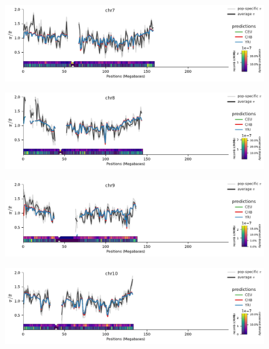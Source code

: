 \documentclass[11pt]{article}
\begin{document}
\begin{figure}[!htb]
  \centering
  \includegraphics[width=\textwidth]{figures/supplementary/pred_plot_chr7.pdf}
  \label{suppfig:fit-chr7}
\end{figure}


\begin{figure}[!htb]
  \centering
  \includegraphics[width=\textwidth]{figures/supplementary/pred_plot_chr8.pdf}
  \label{suppfig:fit-chr8}
\end{figure}


\begin{figure}[!htb]
  \centering
  \includegraphics[width=\textwidth]{figures/supplementary/pred_plot_chr9.pdf}
  \label{suppfig:fit-chr9}
\end{figure}


\begin{figure}[!htb]
  \centering
  \includegraphics[width=\textwidth]{figures/supplementary/pred_plot_chr10.pdf}
  \label{suppfig:fit-chr10}
\end{figure}
\end{document}
